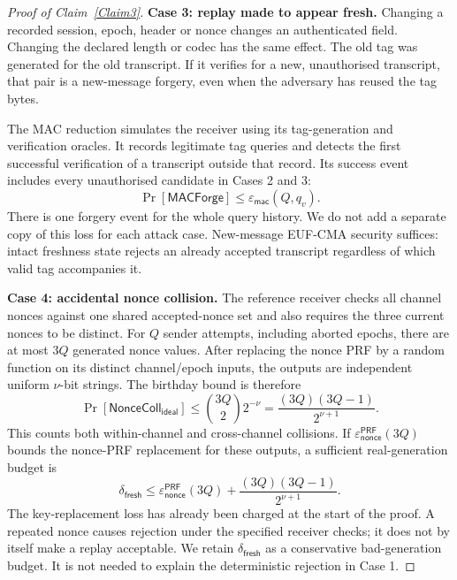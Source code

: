 \documentclass[pdflatex,sn-mathphys-num]{sn-jnl}%
\theoremstyle{definition}
\theoremstyle{game}
\theoremstyle{thmstyleone}%
\theoremstyle{thmstyletwo}%
\theoremstyle{thmstylethree}%
\begin{document}
\begin{proof}[Proof of Claim~\ref{Claim3}]
\textbf{Case 3: replay made to appear fresh.}
Changing a recorded session, epoch, header or nonce changes an authenticated
field. Changing the declared length or codec has the same effect.
The old tag was generated for the old transcript. If it verifies for a
new, unauthorised transcript, that pair is a new-message forgery, even
when the adversary has reused the tag bytes.

The MAC reduction simulates the receiver using its tag-generation and
verification oracles. It records legitimate tag queries and detects the
first successful verification of a transcript outside that record. Its
success event includes every unauthorised candidate in Cases 2 and 3:
\begin{equation}\label{eq:replay-forgery-bound}
\Pr[\mathsf{MACForge}]\le\varepsilon_{\mathsf{mac}}(Q,q_v).
\end{equation}
There is one forgery event for the whole query history. We do not add a
separate copy of this loss for each attack case. New-message EUF-CMA
security suffices: intact freshness state rejects an already accepted
transcript regardless of which valid tag accompanies it.

\textbf{Case 4: accidental nonce collision.}
The reference receiver checks all channel nonces against one shared
accepted-nonce set and also requires the three current nonces to be
distinct. For $Q$ sender attempts, including aborted epochs, there are at most $3Q$
generated nonce values. After replacing the nonce PRF by a random function on its
distinct channel/epoch inputs, the outputs are independent uniform
$\nu$-bit strings. The birthday bound is therefore
\begin{equation}\label{eq:pooled-nonce-collision}
\Pr[\mathsf{NonceColl}_{\mathsf{ideal}}]
\le\binom{3Q}{2}2^{-\nu}
=\frac{(3Q)(3Q-1)}{2^{\nu+1}}.
\end{equation}
This counts both within-channel and cross-channel collisions. If
$\varepsilon_{\mathsf{nonce}}^{\mathsf{PRF}}(3Q)$ bounds the nonce-PRF
replacement for these outputs, a sufficient real-generation budget is
\begin{equation}\label{eq:three-channel-nonce-collision}
\delta_{\mathsf{fresh}}
\le\varepsilon_{\mathsf{nonce}}^{\mathsf{PRF}}(3Q)
+\frac{(3Q)(3Q-1)}{2^{\nu+1}}.
\end{equation}
The key-replacement loss has already been charged at the start of the
proof. A repeated nonce causes rejection under the specified receiver
checks; it does not by itself make a replay acceptable. We retain
$\delta_{\mathsf{fresh}}$ as a conservative bad-generation budget.
It is not needed to explain the deterministic rejection in Case 1.


\end{proof}
\end{document}
